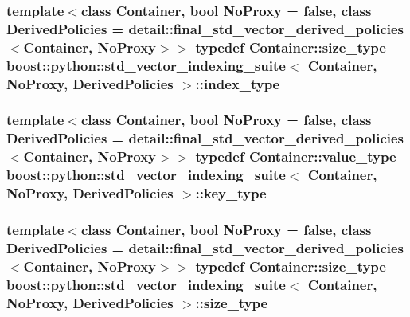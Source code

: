 \subsubsection[{\texorpdfstring{index\+\_\+type}{index_type}}]{\setlength{\rightskip}{0pt plus 5cm}template$<$class Container, bool No\+Proxy = false, class Derived\+Policies = detail\+::final\+\_\+std\+\_\+vector\+\_\+derived\+\_\+policies$<$\+Container, No\+Proxy$>$$>$ typedef Container\+::size\+\_\+type {\bf boost\+::python\+::std\+\_\+vector\+\_\+indexing\+\_\+suite}$<$ Container, No\+Proxy, Derived\+Policies $>$\+::{\bf index\+\_\+type}}\hypertarget{classboost_1_1python_1_1std__vector__indexing__suite_a3124827b535a08798fbd33b9fee7b668}{}\label{classboost_1_1python_1_1std__vector__indexing__suite_a3124827b535a08798fbd33b9fee7b668}
\subsubsection[{\texorpdfstring{key\+\_\+type}{key_type}}]{\setlength{\rightskip}{0pt plus 5cm}template$<$class Container, bool No\+Proxy = false, class Derived\+Policies = detail\+::final\+\_\+std\+\_\+vector\+\_\+derived\+\_\+policies$<$\+Container, No\+Proxy$>$$>$ typedef Container\+::value\+\_\+type {\bf boost\+::python\+::std\+\_\+vector\+\_\+indexing\+\_\+suite}$<$ Container, No\+Proxy, Derived\+Policies $>$\+::{\bf key\+\_\+type}}\hypertarget{classboost_1_1python_1_1std__vector__indexing__suite_aad8e15443d4d920d6b15e1781fba568a}{}\label{classboost_1_1python_1_1std__vector__indexing__suite_aad8e15443d4d920d6b15e1781fba568a}
\subsubsection[{\texorpdfstring{size\+\_\+type}{size_type}}]{\setlength{\rightskip}{0pt plus 5cm}template$<$class Container, bool No\+Proxy = false, class Derived\+Policies = detail\+::final\+\_\+std\+\_\+vector\+\_\+derived\+\_\+policies$<$\+Container, No\+Proxy$>$$>$ typedef Container\+::size\+\_\+type {\bf boost\+::python\+::std\+\_\+vector\+\_\+indexing\+\_\+suite}$<$ Container, No\+Proxy, Derived\+Policies $>$\+::{\bf size\+\_\+type}}\hypertarget{classboost_1_1python_1_1std__vector__indexing__suite_af582d879611acb090b6d227a64914cc6}{}\label{classboost_1_1python_1_1std__vector__indexing__suite_af582d879611acb090b6d227a64914cc6}


